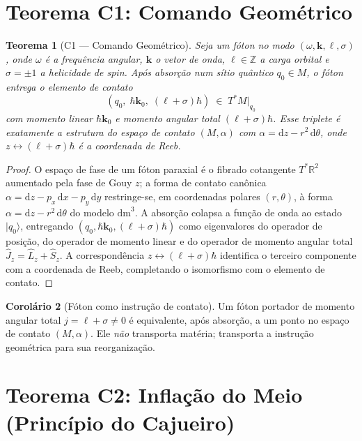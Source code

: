 \documentclass[12pt,a4paper,twoside]{book}
\theoremstyle{plain}
\newtheorem{teorema}{Teorema}[section]
\theoremstyle{definition}
\newtheorem{corolario}[teorema]{Corolário}
\theoremstyle{definition}
\newcommand{\R}{\mathbb{R}}
\newcommand{\Z}{\mathbb{Z}}
\newcommand{\dd}{\mathrm{d}}
\newcommand{\dm}{\mathrm{dm}^{3}}
\begin{document}
\section{Teorema C1: Comando Geométrico}
\label{sec:C1}

\begin{teorema}[C1 — Comando Geométrico]\label{thm:C1}
Seja um fóton no modo $(\omega, \mathbf{k}, \ell, \sigma)$, onde $\omega$ é a
frequência angular, $\mathbf{k}$ o vetor de onda, $\ell \in \Z$ a carga
orbital e $\sigma = \pm 1$ a helicidade de spin. Após absorção num sítio
quântico $q_{0} \in M$, o fóton entrega o elemento de contato
\[
  (q_{0},\;\hbar\mathbf{k}_{0},\;(\ell+\sigma)\hbar)
  \;\in\; T^{*}M\big|_{q_{0}}
\]
com momento linear $\hbar\mathbf{k}_{0}$ e momento angular total
$(\ell+\sigma)\hbar$. Esse triplete é exatamente a estrutura do espaço
de contato $(M,\alpha)$ com $\alpha = \dd z - r^{2}\,\dd\theta$, onde
$z \leftrightarrow (\ell+\sigma)\hbar$ é a coordenada de Reeb.
\end{teorema}

\begin{proof}
O espaço de fase de um fóton paraxial é o fibrado cotangente $T^{*}\R^{2}$
aumentado pela fase de Gouy $z$; a forma de contato canônica $\alpha = \dd z -
p_{x}\,\dd x - p_{y}\,\dd y$ restringe-se, em coordenadas polares
$(r,\theta)$, à forma $\alpha = \dd z - r^{2}\,\dd\theta$ do modelo
$\dm$. A absorção colapsa a função de onda ao estado $|q_{0}\rangle$,
entregando $(q_{0}, \hbar\mathbf{k}_{0}, (\ell+\sigma)\hbar)$ como
eigenvalores do operador de posição, do operador de momento linear e do
operador de momento angular total $\hat{J}_{z} = \hat{L}_{z} +
\hat{S}_{z}$. A correspondência $z \leftrightarrow (\ell+\sigma)\hbar$
identifica o terceiro componente com a coordenada de Reeb, completando o
isomorfismo com o elemento de contato.
\end{proof}

\begin{corolario}[Fóton como instrução de contato]
Um fóton portador de momento angular total $j = \ell + \sigma \ne 0$ é
equivalente, após absorção, a um ponto no espaço de contato $(M,\alpha)$.
Ele \emph{não} transporta matéria; transporta a instrução geométrica para
sua reorganização.
\end{corolario}

\section{Teorema C2: Inflação do Meio (Princípio do Cajueiro)}
\label{sec:C2}
\end{document}
